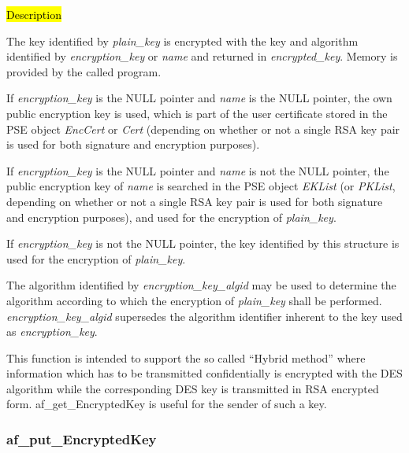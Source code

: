 




\hl{Description}

The key identified by {\em plain\_key} is encrypted with the key and algorithm identified by
{\em encryption\_key} or {\em name} and returned in 
{\em encrypted\_key}. Memory is provided by the called program. 

If {\em encryption\_key} is the NULL pointer and {\em name} is the NULL pointer,
the own public encryption key is used, which is part of the user certificate stored in the PSE object
{\em EncCert} or {\em Cert} (depending on whether or not a single RSA key pair is used for both signature and
encryption purposes). 

If {\em encryption\_key} is the NULL pointer and {\em name} 
is not the NULL pointer, the public encryption key of {\em name} is searched in 
the PSE object {\em EKList} (or {\em PKList}, depending on whether or not a single RSA key pair is used for both signature and
encryption purposes), and used for the encryption of {\em plain\_key}.

If {\em encryption\_key} is not the NULL pointer, the key identified by this structure
is used for the encryption of {\em plain\_key}. 

The algorithm identified by {\em encryption\_key\_algid} may be used to determine the algorithm
according to which the encryption of {\em plain\_key} shall be performed. {\em encryption\_key\_algid}
supersedes the algorithm identifier inherent to the key used as {\em encryption\_key}. 

This function is intended to support the so called ``Hybrid method'' where information which
has to be transmitted confidentially is encrypted with the DES algorithm while the corresponding DES key
is transmitted in RSA encrypted form. af\_get\_EncryptedKey is useful for the sender
of such a key.

\subsubsection{af\_put\_EncryptedKey}
\label{af_put_EncryptedKey}

